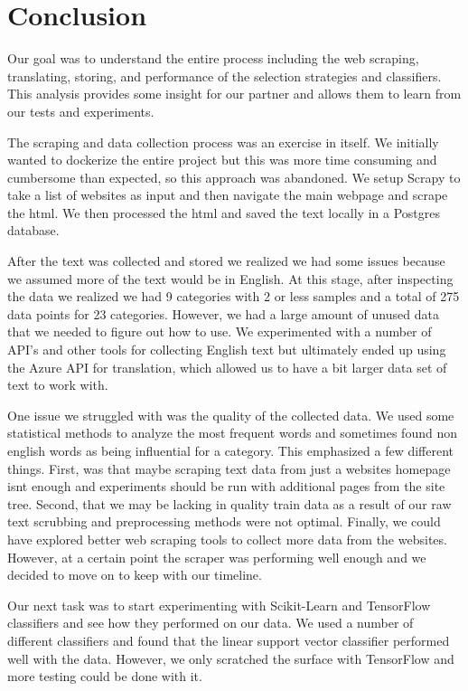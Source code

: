 \chapter*{Conclusion}

Our goal was to understand the entire process including the web scraping, translating, storing, and performance of the selection strategies and classifiers. This analysis provides some insight for our partner and allows them to learn from our tests and experiments. 

The scraping and data collection process was an exercise in itself. We initially wanted to dockerize the entire project but this was more time consuming and cumbersome than expected, so this approach was abandoned. We setup Scrapy to take a list of websites as input and then navigate the main webpage and scrape the html. We then processed the html and saved the text locally in a Postgres database. 

After the text was collected and stored we realized we had some issues because we assumed more of the text would be in English. At this stage, after inspecting the data we realized we had 9 categories with 2 or less samples and a total of 275 data points for 23 categories. However, we had a large amount of unused data that we needed to figure out how to use. We experimented with a number of API's and other tools for collecting English text but ultimately ended up using the Azure API for translation, which allowed us to have a bit larger data set of text to work with. 

One issue we struggled with was the quality of the collected data. We used some statistical methods to analyze the most frequent words and sometimes found non english words as being influential for a category. This emphasized a few different things. First, was that maybe scraping text data from just a websites homepage isnt enough and experiments should be run with additional pages from the site tree. Second, that we may be lacking in quality train data as a result of our raw text scrubbing and preprocessing methods were not optimal. Finally, we could have explored better web scraping tools to collect more data from the websites. However, at a certain point the scraper was performing well enough and we decided to move on to keep with our timeline.

Our next task was to start experimenting with Scikit-Learn and TensorFlow classifiers and see how they performed on our data. We used a number of different classifiers and found that the linear support vector classifier performed well with the data. However, we only scratched the surface with TensorFlow and more testing could be done with it. 

